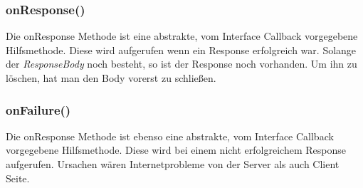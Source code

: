 \subsubsection{onResponse()}
Die onResponse Methode ist eine abstrakte, vom Interface Callback vorgegebene Hilfsmethode. Diese wird aufgerufen 
wenn ein Response erfolgreich war. Solange der \textit{ResponseBody} noch besteht, so ist der Response noch vorhanden.
Um ihn zu löschen, hat man den Body vorerst zu schließen.

\subsubsection{onFailure()}
Die onResponse Methode ist ebenso eine abstrakte, vom Interface Callback vorgegebene Hilfsmethode. Diese wird bei einem
nicht erfolgreichem Response aufgerufen. Ursachen wären Internetprobleme von der Server als auch Client Seite. 




